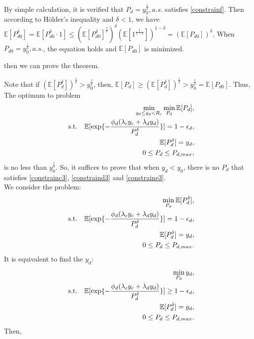 \documentclass[12pt, draftclsnofoot, journal, letterpaper, onecolumn]{IEEEtran}
\begin{document}
\begin{IEEEproof}
By simple calculation, it is verified that $P_d=y_0^\frac{1}{\delta},a.s.$ satisfies \eqref{constrainf}.
Then according to H\"{o}lder's inequality\cite{probability} and $\delta<1$, we have $\mathbb{E}[P_{d0}^\delta]=\mathbb{E}[P_{d0}^\delta\cdot 1]\leq(\mathbb{E}[P_{d0}^\delta]^{\frac{1}{\delta}})^\delta(\mathbb{E}[1^{\frac{1}{1-\delta}}])^{1-\delta}=(\mathbb{E}[P_{d0}])^\delta.$ When $P_{d0}=y_0^\frac{1}{\delta},a.s.$, the equation holds and $\mathbb{E}[P_{d0}]$ is minimized.
\end{IEEEproof}
then we can prove the theorem.
\begin{IEEEproof}
Note that if $(\mathbb{E}[P_d^\delta])^\frac{1}{\delta}>y_0^\frac{1}{\delta}$, then, $\mathbb{E}[P_d]\geq(\mathbb{E}[P_d^\delta])^\frac{1}{\delta}>y_0^\frac{1}{\delta}=\mathbb{E}[P_{d0}].$ Thus,
The optimum to problem
\begin{eqnarray*}
&&\min_{y_0\leq y_d<R_c}\min_{P_d}\mathbb{E}[P_d],\\
&&{\rm s.t.}~~~\mathbb{E}[\exp\{-\frac{\phi_d(\lambda_cy_c+\lambda_dy_d)}{P_d^\delta}\}]=1-\epsilon_d,\\
&& ~~~~~~~\mathbb{E}[P_d^\delta]=y_d,\\
&& ~~~~~~~0\leq P_d\leq P_{d,max},
\end{eqnarray*}
is no less than $y_0^{\frac{1}{\delta}}$. So, it suffices to prove that when $y_d<y_0$, there is no $P_d$ that satisfies \eqref{constrainc3}, \eqref{constraind3} and \eqref{constraine3}.\\
We consider the problem:
\begin{eqnarray*}
&&\min_{P_d}\mathbb{E}[P_d^\delta],\\
&&{\rm s.t.}~~~\mathbb{E}[\exp\{-\frac{\phi_d(\lambda_cy_c+\lambda_dy_d)}{P_d^\delta}\}]=1-\epsilon_d,\\
&& ~~~~~~~\mathbb{E}[P_d^\delta]=y_d,\\
&& ~~~~~~~0\leq P_d\leq P_{d,max}.
\end{eqnarray*}
It is equivalent to find the $y_d$:
\begin{eqnarray*}
&&\min_{P_d} y_d,\\
&&{\rm s.t.}~~~\mathbb{E}[\exp\{-\frac{\phi_d(\lambda_cy_c+\lambda_dy_d)}{P_d^\delta}\}]\geq1-\epsilon_d,\\
&& ~~~~~~~\mathbb{E}[P_d^\delta]=y_d,\\
&& ~~~~~~~0\leq P_d\leq P_{d,max}.
\end{eqnarray*}
Then,
\begin{eqnarray*}

\end{eqnarray*}
\end{IEEEproof}
\end{document}
